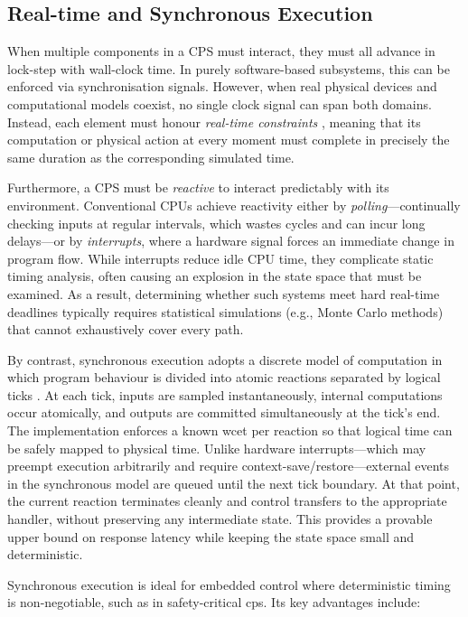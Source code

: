 \subsection{Real-time and Synchronous Execution}
\label{sec:real_time_syn}

When multiple components in a CPS must interact, they must all advance in lock-step with wall-clock time. In purely software-based subsystems, this can be enforced via synchronisation signals. However, when real physical devices and computational models coexist, no single clock signal can span both domains. Instead, each element must honour \emph{real-time constraints} \cite{1012687}, meaning that its computation or physical action at every moment must complete in precisely the same duration as the corresponding simulated time.

Furthermore, a CPS must be \emph{reactive} to interact predictably with its environment. Conventional CPUs achieve reactivity either by \emph{polling}—continually checking inputs at regular intervals, which wastes cycles and can incur long delays—or by \emph{interrupts}, where a hardware signal forces an immediate change in program flow. While interrupts reduce idle CPU time, they complicate static timing analysis, often causing an explosion in the state space that must be examined. As a result, determining whether such systems meet hard real-time deadlines typically requires statistical simulations (e.g., Monte Carlo methods) that cannot exhaustively cover every path.

By contrast, synchronous execution adopts a discrete model of computation in which program behaviour is divided into atomic reactions separated by logical ticks \cite{berry_foundations_2000, boussinot_sl_1996}. At each tick, inputs are sampled instantaneously, internal computations occur atomically, and outputs are committed simultaneously at the tick's end. The implementation enforces a known \gls{wcet} per reaction so that logical time can be safely mapped to physical time. Unlike hardware interrupts—which may preempt execution arbitrarily and require context-save/restore—external events in the synchronous model are queued until the next tick boundary. At that point, the current reaction terminates cleanly and control transfers to the appropriate handler, without preserving any intermediate state. This provides a provable upper bound on response latency while keeping the state space small and deterministic.

Synchronous execution is ideal for embedded control where deterministic timing is non-negotiable, such as in safety-critical \gls{cps}. Its key advantages include:

